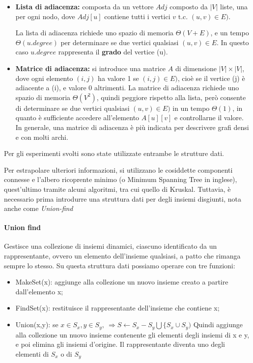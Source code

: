 \documentclass[
]{article}
\begin{document}
\begin{itemize}
\item
  \textbf{Lista di adiacenza:} composta da un vettore \(Adj\) composto
  da \(|V|\) liste, una per ogni nodo, dove \(Adj[u]\) contiene tutti i
  vertici \(v\) t.c. \((u, v) \in E)\).

  La lista di adiacenza richiede uno spazio di memoria
  \(\Theta(V + E)\), e un tempo \(\Theta(u.degree)\) per determinare se
  due vertici qualsiasi \((u, v) \in E\). In questo caso \(u.degree\)
  rappresenta il \textbf{grado} del vertice (u).
\item
  \textbf{Matrice di adiacenza:} si introduce una matrice \(A\) di
  dimensione \(|V|\times|V|\), dove ogni elemento \((i,j)\) ha valore 1
  se \((i, j) \in E)\), cioè se il vertice (j) è adiacente a (i), e
  valore 0 altrimenti. La matrice di adiacenza richiede uno spazio di
  memoria \(\Theta(V^2)\), quindi peggiore rispetto alla lista, però
  consente di determinare se due vertici qualsiasi \((u, v) \in E)\) in
  un tempo \(\Theta(1)\), in quanto è sufficiente accedere all'elemento
  \(A[u][v]\) e controllarne il valore. In generale, una matrice di
  adiacenza è più indicata per descrivere grafi densi e con molti archi.
\end{itemize}

Per gli esperimenti svolti sono state utilizzate entrambe le strutture
dati.

Per estrapolare ulteriori informazioni, si utilizzano le cosiddette
componenti connesse e l'albero ricoprente minimo (o Minimum Spanning
Tree in inglese), quest'ultimo tramite alcuni algoritmi, tra cui quello
di Kruskal. Tuttavia, è necessario prima introdurre una struttura dati
per degli insiemi disgiunti, nota anche come \emph{Union-find}

\hypertarget{union-find}{%
\paragraph{Union find}\label{union-find}}

Gestisce una collezione di insiemi dinamici, ciascuno identificato da un
rappresentante, ovvero un elemento dell'insieme qualsiasi, a patto che
rimanga sempre lo stesso. Su questa struttura dati possiamo operare con
tre funzioni:

\begin{itemize}
\item
  MakeSet(x): aggiunge alla collezione un nuovo insieme creato a partire
  dall'elemento x;
\item
  FindSet(x): restituisce il rappresentante dell'insieme che contiene x;
\item
  Union(x,y): se
  \(x \in S_x, y \in S_y, \ \Rightarrow S \leftarrow S_x -S_y \bigcup \{S_x \cup S_y)\)
  Quindi aggiunge alla collezione un nuovo insieme contenente gli
  elementi degli insiemi di x e y, e poi elimina gli insiemi d'origine.
  Il rappresentante diventa uno degli elementi di \(S_x\) o di \(S_y\)
\end{itemize}
\end{document}
